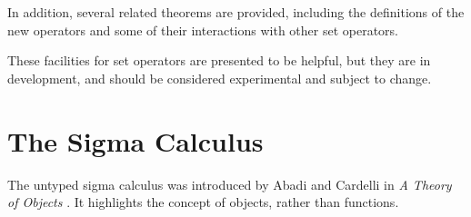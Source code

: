 \documentclass[envcountsame,runningheads]{llncs}
\begin{document}
In addition, several related theorems are provided, including the
definitions of the new operators and some of their interactions with other
set operators.


These facilities for set operators are presented to be helpful,
but they are in
development, and should be considered
experimental and subject to change.



%
\section{The Sigma Calculus}
%
\label{sigmacalculus}

The untyped sigma calculus was introduced by Abadi and Cardelli in
{\it A Theory of Objects} \cite{AbCa96}.
It highlights the concept of objects,
rather than functions.
\end{document}
